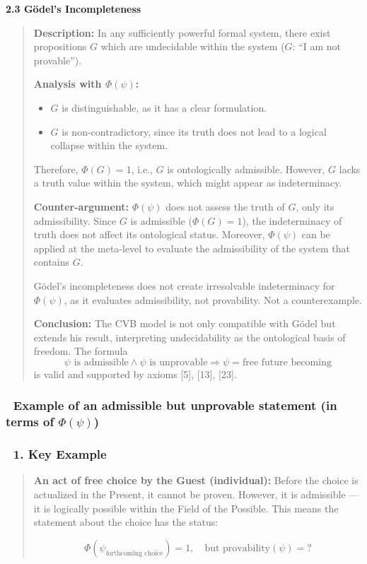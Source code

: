 \documentclass[12pt]{article}
\begin{document}
\textbf{2.3 Gödel’s Incompleteness}

\begin{quote}
\textbf{Description:} In any sufficiently powerful formal system, there exist propositions $G$ which are undecidable within the system ($G$: ``I am not provable'').

\textbf{Analysis with $\Phi(\psi)$:}
\begin{itemize}
\item $G$ is distinguishable, as it has a clear formulation.
\item $G$ is non-contradictory, since its truth does not lead to a logical collapse within the system.
\end{itemize}
Therefore, $\Phi(G) = 1$, i.e., $G$ is ontologically admissible. However, $G$ lacks a truth value within the system, which might appear as indeterminacy.

\textbf{Counter-argument:}
$\Phi(\psi)$ does not assess the truth of $G$, only its admissibility. Since $G$ is admissible ($\Phi(G) = 1$), the indeterminacy of truth does not affect its ontological status. Moreover, $\Phi(\psi)$ can be applied at the meta-level to evaluate the admissibility of the system that contains $G$.

Gödel’s incompleteness does not create irresolvable indeterminacy for $\Phi(\psi)$, as it evaluates admissibility, not provability. Not a counterexample.

\textbf{Conclusion:} The CVB model is not only compatible with Gödel but extends his result, interpreting undecidability as the ontological basis of freedom. The formula
\[
\psi \text{ is admissible} \land \psi \text{ is unprovable} \Rightarrow \psi = \text{free future becoming}
\]
is valid and supported by axioms [5], [13], [23].
\end{quote}

\subsubsection*{🔹 Example of an admissible but unprovable statement (in terms of $\Phi(\psi)$)}

\subsubsection*{🔹 1. Key Example}

\begin{quote}
\textbf{An act of free choice by the Guest (individual):} Before the choice is actualized in the Present, it cannot be proven. However, it is admissible — it is logically possible within the Field of the Possible. This means the statement about the choice has the status:

\[
\Phi(\psi_{\text{forthcoming choice}}) = 1, \quad \text{but } \text{provability}(\psi) = ?
\]
\end{quote}
\end{document}
